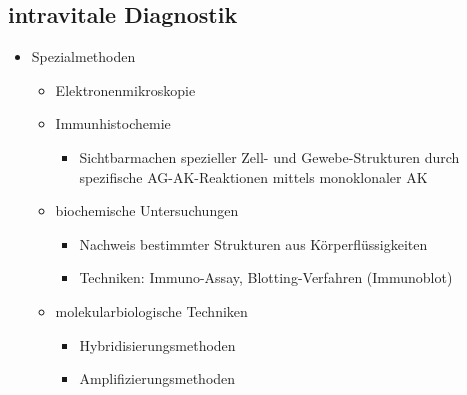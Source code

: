 \begin{it>emize}
\subsection{intravitale Diagnostik}
	\begin{itemize}
		\item Spezialmethoden
			\begin{itemize}
				\item Elektronenmikroskopie
				\item Immunhistochemie
					\begin{itemize}
						\item Sichtbarmachen spezieller Zell- und Gewebe-Strukturen durch spezifische AG-AK-Reaktionen mittels monoklonaler AK
					\end{itemize}
				\item biochemische Untersuchungen
					\begin{itemize}
						\item Nachweis bestimmter Strukturen aus Körperflüssigkeiten
						\item Techniken: Immuno-Assay, Blotting-Verfahren (Immunoblot)
					\end{itemize}
				\item molekularbiologische Techniken
					\begin{itemize}
						\item Hybridisierungsmethoden
						\item Amplifizierungsmethoden
					\end{itemize}
		\end{itemize}
	\end{itemize}


\end{it>emize}
